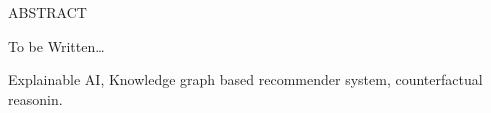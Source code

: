 \begin{center}
    ABSTRACT
\vspace{5mm} %
\end{center}

To be Written\dots

\vspace{5mm} %
 Explainable AI, Knowledge graph based recommender system, counterfactual reasonin.  %
